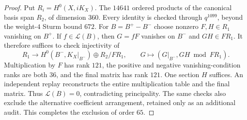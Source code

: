\begin{proof}
Put $R_i=H^0(X,iK_X)$.
The $14641$ ordered products of the canonical basis span $R_2$, of dimension $360$.
Every identity is checked through $q^{1099}$, beyond the weight-$4$ Sturm bound $672$.
For $B=B^+-B^-$ choose nonzero $F,H\in R_1$ vanishing on $B^+$.
If $f\in\mathcal L(B)$, then $G=fF$ vanishes on $B^-$ and $GH\in FR_1$.
It therefore suffices to check injectivity of
\[
 R_1\longrightarrow H^0(B^-,K_X|_{B^-})\oplus R_2/FR_1,
 \qquad G\longmapsto(G|_{B^-},GH\bmod FR_1).
\]
Multiplication by $F$ has rank $121$, the positive and negative vanishing-condition ranks are both $36$, and the final matrix has rank $121$.
One section $H$ suffices.
An independent replay reconstructs the entire multiplication table and the final matrix.
Thus $\mathcal L(B)=0$, contradicting principality.
The same checks also exclude the alternative coefficient arrangement, retained only as an additional audit.
This completes the exclusion of order $65$.
\end{proof}
